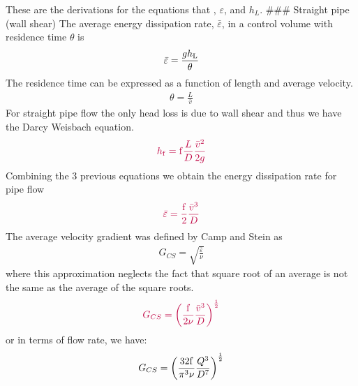 \documentclass[letterpaper,10pt,english]{sphinxmanual}
\begin{document}
These are the derivations for the equations that , \(\varepsilon\), and \(h_L\). \#\#\# Straight pipe (wall shear) The average energy dissipation rate, \(\bar\varepsilon\), in a control volume with residence time \(\theta\) is
\begin{equation}\label{equation:Rapid_Mix/RM_Derivations:Rapid_Mix/RM_Derivations:20}
\begin{split}\bar\varepsilon = \frac{gh_{\rm{L}}}{\theta}\end{split}
\end{equation}
The residence time can be expressed as a function of length and average velocity.
\begin{equation}\label{equation:Rapid_Mix/RM_Derivations:Rapid_Mix/RM_Derivations:21}
\begin{split}\theta = \frac{L}{\bar v}\end{split}
\end{equation}
For straight pipe flow the only head loss is due to wall shear and thus we have the Darcy Weisbach equation.
\begin{equation}\label{equation:Rapid_Mix/RM_Derivations:Rapid_Mix/RM_Derivations:22}
\begin{split}\color{purple}{
  h_{{\rm f}} = {{\rm f}} \frac{L}{D} \frac{\bar v^2}{2g}
  }\end{split}
\end{equation}
Combining the 3 previous equations we obtain the energy dissipation rate for pipe flow
\begin{equation}\label{equation:Rapid_Mix/RM_Derivations:Rapid_Mix/RM_Derivations:23}
\begin{split}\color{purple}{
  \bar\varepsilon = \frac{{\rm f}}{2} \frac{\bar v^3}{D}
}\end{split}
\end{equation}
The average velocity gradient was defined by Camp and Stein as
\begin{equation}\label{equation:Rapid_Mix/RM_Derivations:Rapid_Mix/RM_Derivations:24}
\begin{split}G_{CS} = \sqrt{\frac{\bar \varepsilon}{\nu}}\end{split}
\end{equation}
where this approximation neglects the fact that square root of an average is not the same as the average of the square roots.
\begin{equation}\label{equation:Rapid_Mix/RM_Derivations:Rapid_Mix/RM_Derivations:25}
\begin{split}\color{purple}{
  G_{CS} = \left(\frac{{\rm f}}{2\nu} \frac{\bar v^3}{D} \right)^\frac{1}{2}
}\end{split}
\end{equation}
or in terms of flow rate, we have:
\begin{equation}\label{equation:Rapid_Mix/RM_Derivations:Rapid_Mix/RM_Derivations:26}
\begin{split}G_{CS} = \left(\frac{\rm{32f}}{ \pi^3\nu} \frac{Q^3}{D^7} \right)^\frac{1}{2}\end{split}
\end{equation}
\end{document}
